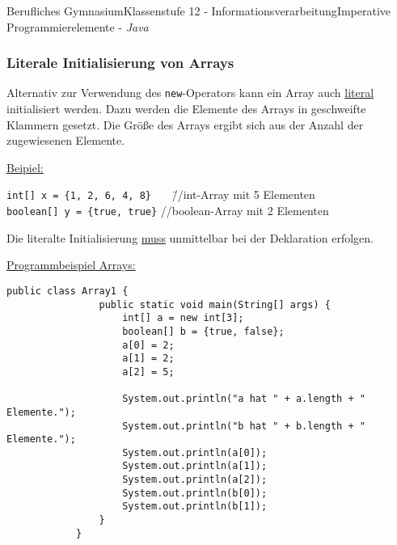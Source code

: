 \documentclass[oneside,openany,headings=optiontotoc,11pt,numbers=noenddot]{article}
\begin{document}
\begin{worksheet}{Berufliches Gymnasium}{Klassenstufe 12 - Informationsverarbeitung}{Imperative Programmierelemente - \textit{Java}}
		\subsubsection{Literale Initialisierung von Arrays}
		Alternativ zur Verwendung des \lstinline[style=JavaInputStyle]|new|-Operators kann ein Array auch \ul{literal} initialisiert werden. Dazu werden die Elemente des Arrays in geschweifte Klammern gesetzt. Die Größe des Arrays ergibt sich aus der Anzahl der zugewiesenen Elemente.\\
		\par\noindent
		\underline{Beipiel:}\\
		\begin{tabbing}
			\lstinline[style=JavaInputStyle]|int[] x = {1, 2, 6, 4, 8}|~~~ \= //int-Array mit 5 Elementen\\
			\lstinline[style=JavaInputStyle]|boolean[] y = {true, true}| \> //boolean-Array mit 2 Elementen
		\end{tabbing}
		Die literalte Initialisierung \underline{muss} unmittelbar bei der Deklaration erfolgen.\\
		\par\noindent
		\underline{Programmbeispiel Arrays:}
		\begin{lstlisting}[style=JavaInputStyle]
			public class Array1 {
				public static void main(String[] args) {
					int[] a = new int[3];
					boolean[] b = {true, false};
					a[0] = 2;
					a[1] = 2;
					a[2] = 5;
					
					System.out.println("a hat " + a.length + " Elemente.");
					System.out.println("b hat " + b.length + " Elemente.");
					System.out.println(a[0]);
					System.out.println(a[1]);
					System.out.println(a[2]);
					System.out.println(b[0]);
					System.out.println(b[1]);
				}
			}
		\end{lstlisting}

\end{worksheet}
\end{document}
